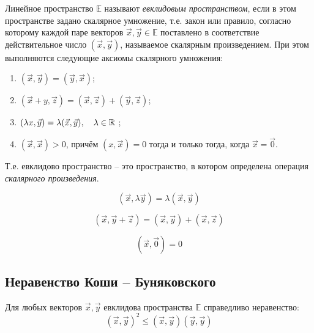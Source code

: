 \begin{definition}
  Линейное пространство $\mathbb{E}$ называют \textit{евклидовым пространством}, если в этом пространстве задано скалярное умножение, т.е. закон или правило, согласно которому каждой паре векторов $\vec{x}, \vec{y} \in \mathbb{E}$ поставлено в соответствие действительное число $(\vec{x}, \vec{y})$, называемое скалярным произведением. При этом выполняются следующие аксиомы скалярного умножения:
  \begin{enumerate}
    \item $(\vec{x}, \vec{y}) = (\vec{y}, \vec{x})$;
    \item $(\vec{x} + y, \vec{z}) = (\vec{x}, \vec{z}) + (\vec{y}, \vec{z})$;
    \item  $(\lambda x, \vec{y}) = \lambda (\vec{x}, \vec{y}), \quad \lambda \in \mathbb{R}$ ;
    \item $(\vec{x}, \vec{x}) > 0$, причём $\left( x, \vec{x} \right) = 0$ тогда и только тогда, когда $\vec{x} = \vec{0}$.
  \end{enumerate}
\end{definition}

\begin{note}
  Т.е. евклидово пространство -- это пространство, в котором определена операция \textit{скалярного произведения}. 
\end{note}

\begin{property}[1]
   \[ (\vec{x}, \lambda \vec{y}) = \lambda (\vec{x}, \vec{y}) \] 
\end{property}

\begin{property}[2]
   \[ (\vec{x}, \vec{y} + \vec{z}) = (\vec{x}, \vec{y}) + (\vec{x}, \vec{z}) \] 
\end{property}

\begin{property}[3]
  \[ (\vec{x}, \vec{0}) = 0 \] 
\end{property}

\subsection{Неравенство Коши -- Буняковского}

\begin{theorem}
  Для любых векторов $\vec{x}, \vec{y}$ евклидова пространства $\mathbb{E}$ справедливо неравенство:  \[
    \left( \vec{x}, \vec{y} \right)^2 \le (\vec{x}, \vec{y})(\vec{y}, \vec{y})
  \] 
\end{theorem}

